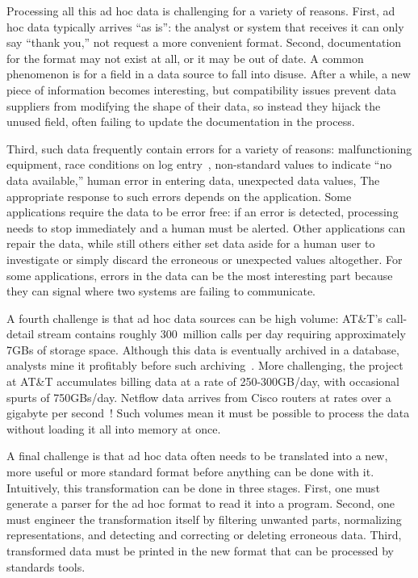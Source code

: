 Processing all this ad hoc data is challenging for a variety of
reasons.  First, ad hoc data typically arrives ``as is'': the analyst
or system that receives it can only say ``thank you,'' not request a
more convenient format.  Second, documentation for the format may not
exist at all, or it may be out of date.  A common phenomenon is for a
field in a data source to fall into disuse.  After a while, a new
piece of information becomes interesting, but compatibility issues
prevent data suppliers from modifying the shape of their data, so
instead they hijack the unused field, often failing to update the
documentation in the process.

Third, such data frequently contain errors for a variety of reasons:
malfunctioning equipment, race conditions on log entry~\cite{wpp},
non-standard values to indicate ``no data available,'' human error in
entering data, unexpected data values, \etc{} The appropriate response
to such errors depends on the application.  Some applications require
the data to be error free: if an error is detected, processing needs
to stop immediately and a human must be alerted.  Other applications
can repair the data, while still others either set data aside for a
human user to investigate or simply discard the erroneous or
unexpected values altogether.  For some applications, errors in the
data can be the most interesting part because they can signal where
two systems are failing to communicate.

A fourth challenge is that ad hoc data sources can be high volume:
AT\&T's call-detail stream contains roughly 300~million calls per day
requiring approximately 7GBs of storage space. Although this data is
eventually archived in a database, analysts mine it profitably before
such archiving~\cite{kdd98,kdd99}. More challenging, the \ningaui{}
project at AT\&T accumulates billing data at a rate of 250-300GB/day,
with occasional spurts of 750GBs/day. Netflow data arrives from Cisco
routers at rates over a gigabyte per second~\cite{gigascope}! Such
volumes mean it must be possible to process the data without loading
it all into memory at once.

A final challenge is that ad hoc data often needs to be translated
into a new, more useful or more standard format before anything can be
done with it.  Intuitively, this transformation can be done in three
stages.  First, one must generate a parser for the ad hoc format to
read it into a program.  Second, one must engineer the transformation
itself by filtering unwanted parts, normalizing representations, and
detecting and correcting or deleting erroneous data.  Third,
transformed data must be printed in the new format that can be
processed by standards tools.

